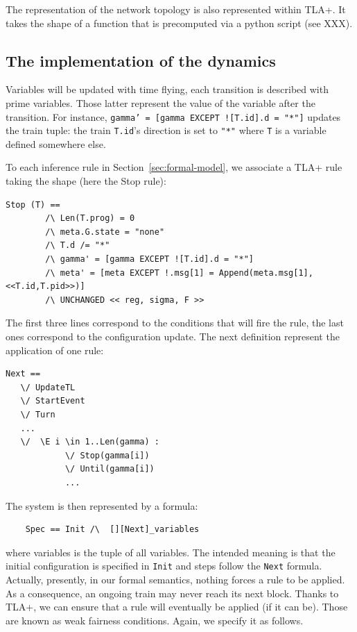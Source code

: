 \documentclass[runningheads]{llncs}
\begin{document}
The representation of the network topology is also represented within TLA+. It takes the shape of a function that is precomputed via a python script (see XXX). 

\subsection{The implementation of the dynamics}

Variables will be updated with time flying, each transition is described with prime variables. Those latter represent the value of the variable after the transition. For instance, \texttt{gamma' = [gamma EXCEPT ![T.id].d = "*"]} updates the train tuple: the train \texttt{T.id}'s direction is set to \texttt{"*"} where  \texttt{T} is a variable  defined somewhere else. 

To each inference rule in Section~\ref{sec:formal-model}, we associate a TLA+ rule taking the shape (here the Stop rule): 
\begin{verbatim}
Stop (T) ==
        /\ Len(T.prog) = 0
        /\ meta.G.state = "none"
        /\ T.d /= "*"
        /\ gamma' = [gamma EXCEPT ![T.id].d = "*"]
        /\ meta' = [meta EXCEPT !.msg[1] = Append(meta.msg[1],<<T.id,T.pid>>)]
        /\ UNCHANGED << reg, sigma, F >>
 \end{verbatim}
The first three lines correspond to the conditions that will fire the rule, the last ones correspond to the configuration update. The next definition represent the application of one rule:
\begin{verbatim}
Next == 
   \/ UpdateTL
   \/ StartEvent
   \/ Turn
   ...
   \/  \E i \in 1..Len(gamma) :
            \/ Stop(gamma[i])
            \/ Until(gamma[i])
            ...
\end{verbatim}       
        
The system is then represented by a formula:
\begin{verbatim}
    Spec == Init /\  [][Next]_variables
\end{verbatim}%
where variables is the tuple of all variables. The intended meaning is that the initial configuration is specified in \texttt{Init} and steps follow the \texttt{Next} formula.  Actually, presently, in our formal semantics, nothing forces a rule to be applied. As a consequence, an ongoing train may never reach its next block. Thanks to TLA+, we can ensure that a rule will eventually be applied (if it can be). Those are known as weak fairness conditions. Again, we specify it as follows. 
\end{document}
